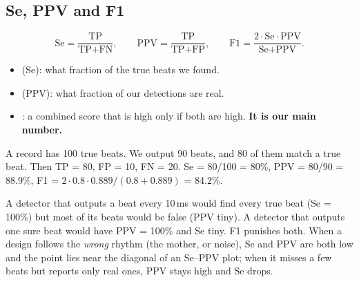 \documentclass[11pt]{article}
\begin{document}
\begin{center}
\end{center}

\subsection{Se, PPV and F1}
\[
\text{Se} = \frac{\text{TP}}{\text{TP}+\text{FN}},\qquad
\text{PPV} = \frac{\text{TP}}{\text{TP}+\text{FP}},\qquad
\text{F1} = \frac{2\cdot\text{Se}\cdot\text{PPV}}{\text{Se}+\text{PPV}}.
\]
\begin{itemize}
  \item {} (Se): what fraction of the true beats we found.
  \item {} (PPV): what fraction of our detections are real.
  \item {}: a combined score that is high only if both are high. \textbf{It is our main number.}
\end{itemize}

\begin{keyfact}
A record has 100 true beats. We output 90 beats, and 80 of them match a true beat. Then TP = 80, FP = 10, FN = 20. Se = 80/100 = 80\%, PPV = 80/90 = 88.9\%, F1 = $2\cdot0.8\cdot0.889/(0.8+0.889)$ = 84.2\%.
\end{keyfact}

\begin{simple}
A detector that outputs a beat every 10\,ms would find every true beat (Se = 100\%) but most of its beats would be false (PPV tiny). A detector that outputs one sure beat would have PPV = 100\% and Se tiny. F1 punishes both. When a design follows the \emph{wrong} rhythm (the mother, or noise), Se and PPV are both low and the point lies near the diagonal of an Se--PPV plot; when it misses a few beats but reports only real ones, PPV stays high and Se drops.
\end{simple}
\end{document}
